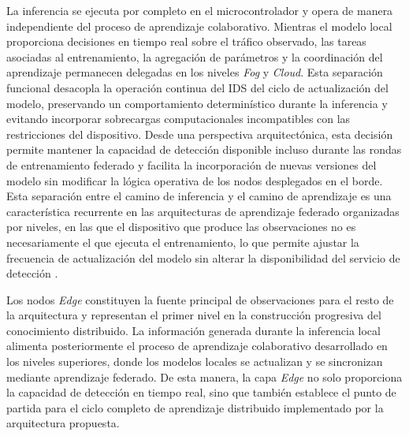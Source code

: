 \documentclass[journal,article,submit,moreauthors]{Definitions/mdpi}
\begin{document}
La inferencia se ejecuta por completo en el microcontrolador y opera de manera independiente del proceso de aprendizaje colaborativo. Mientras el modelo local proporciona decisiones en tiempo real sobre el tráfico observado, las tareas asociadas al entrenamiento, la agregación de parámetros y la coordinación del aprendizaje permanecen delegadas en los niveles \textit{Fog} y \textit{Cloud}. Esta separación funcional desacopla la operación continua del IDS del ciclo de actualización del modelo, preservando un comportamiento determinístico durante la inferencia y evitando incorporar sobrecargas computacionales incompatibles con las restricciones del dispositivo. Desde una perspectiva arquitectónica, esta decisión permite mantener la capacidad de detección disponible incluso durante las rondas de entrenamiento federado y facilita la incorporación de nuevas versiones del modelo sin modificar la lógica operativa de los nodos desplegados en el borde. Esta separación entre el camino de inferencia y el camino de aprendizaje es una característica recurrente en las arquitecturas de aprendizaje federado organizadas por niveles, en las que el dispositivo que produce las observaciones no es necesariamente el que ejecuta el entrenamiento, lo que permite ajustar la frecuencia de actualización del modelo sin alterar la disponibilidad del servicio de detección \cite{Ma2024,Dritsas2025}.

Los nodos \textit{Edge} constituyen la fuente principal de observaciones para el resto de la arquitectura y representan el primer nivel en la construcción progresiva del conocimiento distribuido. La información generada durante la inferencia local alimenta posteriormente el proceso de aprendizaje colaborativo desarrollado en los niveles superiores, donde los modelos locales se actualizan y se sincronizan mediante aprendizaje federado. De esta manera, la capa \textit{Edge} no solo proporciona la capacidad de detección en tiempo real, sino que también establece el punto de partida para el ciclo completo de aprendizaje distribuido implementado por la arquitectura propuesta.
\end{document}
